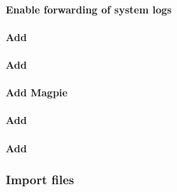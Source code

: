 \documentclass[letterpaper]{article}
\begin{document}
\vspace*{-.2cm}
\paragraph{Enable forwarding of system logs} \label{sec:add_syslog}


\clearpage
\paragraph{Add \clustershell{}}


%

\paragraph{Add \genders{}}


\vspace*{-.1cm}
\paragraph{Add Magpie}


\vspace*{-.1cm}
\paragraph{Add \conman{}} \label{sec:add_conman}


\vspace*{-.1cm}
\paragraph{Add \nhc{}} \label{sec:add_nhc}


\subsubsection{Import files} \label{sec:file_import}


\vspace*{0.2cm}



\end{document}
